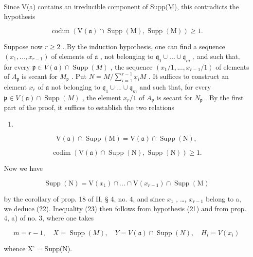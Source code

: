 Since V(a) contains an irreducible component of Supp(M), this contradicts the hypothesis

\[
\operatorname{codim} (\mathrm{V} (\mathfrak {a}) \cap \operatorname{Supp} (\mathrm{M}), \operatorname{Supp} (\mathrm{M})) \geqslant 1.
\]

Suppose now \(r \geqslant 2\) . By the induction hypothesis, one can find a sequence \((x_1, ..., x_{r-1})\) of elements of \(\mathfrak{a}\) , not belonging to \(\mathfrak{q}_1 \cup ... \cup \mathfrak{q}_m\) , and such that, for every \(\mathfrak{p} \in V(\mathfrak{a}) \cap \operatorname{Supp}(M)\) , the sequence \((x_1/1, ..., x_{r-1}/1)\) of elements of \(A_{\mathfrak{p}}\) is secant for \(M_{\mathfrak{p}}\) . Put \(N = M / \sum_{i=1}^{r-1} x_i M\) . It suffices to construct an element \(x_r\) of \(\mathfrak{a}\) not belonging to \(\mathfrak{q}_1 \cup ... \cup \mathfrak{q}_m\) and such that, for every \(\mathfrak{p} \in V(\mathfrak{a}) \cap \operatorname{Supp}(M)\) , the element \(x_r/1\) of \(A_{\mathfrak{p}}\) is secant for \(N_{\mathfrak{p}}\) . By the first part of the proof, it suffices to establish the two relations

\begin{enumerate}
\def\labelenumi{(\arabic{enumi})}
\setcounter{enumi}{21}
\tightlist
\item
\end{enumerate}

\[
\mathrm{V} (\mathfrak {a}) \cap \operatorname{Supp} (\mathrm{M}) = \mathrm{V} (\mathfrak {a}) \cap \operatorname{Supp} (\mathrm{N}),\tag{23}
\]

\[
\operatorname{codim} (\mathrm{V} (\mathfrak {a}) \cap \operatorname{Supp} (\mathrm{N}), \operatorname{Supp} (\mathrm{N})) \geqslant 1.
\]

Now we have

\[
\operatorname{Supp} (\mathrm{N}) = \mathrm{V} (x _ {1}) \cap \dots \cap \mathrm{V} (x _ {r - 1}) \cap \operatorname{Supp} (\mathrm{M})
\]

by the corollary of prop. 18 of II, § 4, no. 4, and since \(x_1\) , \ldots, \(x_{r-1}\) belong to a, we deduce (22). Inequality (23) then follows from hypothesis (21) and from prop. 4, a) of no. 3, where one takes

\[
m = r - 1, \quad X = \operatorname{Supp} (M), \quad Y = V (\mathfrak {a}) \cap \operatorname{Supp} (N), \quad H _ {i} = V (x _ {i})
\]

whence X' = Supp(N).

